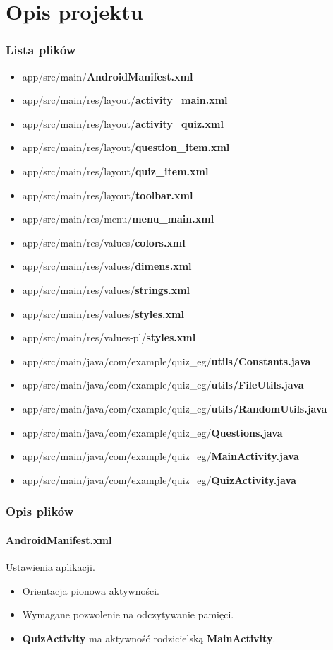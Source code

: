 \documentclass[12pt, a4paper]{article}
\begin{document}
\part{Opis projektu}
\section{Lista plików}
\begin{itemize}
\item app/src/main/\textbf{AndroidManifest.xml}
\item app/src/main/res/layout/\textbf{activity\_main.xml}
\item app/src/main/res/layout/\textbf{activity\_quiz.xml}
\item app/src/main/res/layout/\textbf{question\_item.xml}
\item app/src/main/res/layout/\textbf{quiz\_item.xml}
\item app/src/main/res/layout/\textbf{toolbar.xml}
\item app/src/main/res/menu/\textbf{menu\_main.xml}
\item app/src/main/res/values/\textbf{colors.xml}
\item app/src/main/res/values/\textbf{dimens.xml}
\item app/src/main/res/values/\textbf{strings.xml}
\item app/src/main/res/values/\textbf{styles.xml}
\item app/src/main/res/values-pl/\textbf{styles.xml}
\item app/src/main/java/com/example/quiz\_eg/\textbf{utils/Constants.java}
\item app/src/main/java/com/example/quiz\_eg/\textbf{utils/FileUtils.java}
\item app/src/main/java/com/example/quiz\_eg/\textbf{utils/RandomUtils.java}
\item app/src/main/java/com/example/quiz\_eg/\textbf{Questions.java}
\item app/src/main/java/com/example/quiz\_eg/\textbf{MainActivity.java}
\item app/src/main/java/com/example/quiz\_eg/\textbf{QuizActivity.java}
\end{itemize}
\newpage

\section{Opis plików}

\subsection{AndroidManifest.xml}
Ustawienia aplikacji.
\begin{itemize}
\item Orientacja pionowa aktywności.
\item Wymagane pozwolenie na odczytywanie pamięci.
\item \textbf{QuizActivity} ma aktywność rodzicielską \textbf{MainActivity}.
\end{itemize}
\end{document}
